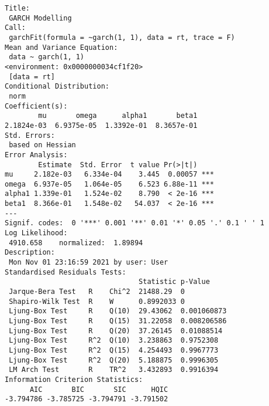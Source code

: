 \documentclass[
  ignorenonframetext,
]{beamer}
\begin{document}
\begin{frame}[fragile]
\begin{verbatim}
Title:
 GARCH Modelling 
Call:
 garchFit(formula = ~garch(1, 1), data = rt, trace = F) 
Mean and Variance Equation:
 data ~ garch(1, 1)
<environment: 0x0000000034cf1f20>
 [data = rt]
Conditional Distribution:
 norm 
Coefficient(s):
        mu       omega      alpha1       beta1  
2.1824e-03  6.9375e-05  1.3392e-01  8.3657e-01  
Std. Errors:
 based on Hessian 
Error Analysis:
        Estimate  Std. Error  t value Pr(>|t|)    
mu     2.182e-03   6.334e-04    3.445  0.00057 ***
omega  6.937e-05   1.064e-05    6.523 6.88e-11 ***
alpha1 1.339e-01   1.524e-02    8.790  < 2e-16 ***
beta1  8.366e-01   1.548e-02   54.037  < 2e-16 ***
---
Signif. codes:  0 '***' 0.001 '**' 0.01 '*' 0.05 '.' 0.1 ' ' 1
Log Likelihood:
 4910.658    normalized:  1.89894 
Description:
 Mon Nov 01 23:16:59 2021 by user: User 
Standardised Residuals Tests:
                                Statistic p-Value    
 Jarque-Bera Test   R    Chi^2  21488.29  0          
 Shapiro-Wilk Test  R    W      0.8992033 0          
 Ljung-Box Test     R    Q(10)  29.43062  0.001060873
 Ljung-Box Test     R    Q(15)  31.22058  0.008206586
 Ljung-Box Test     R    Q(20)  37.26145  0.01088514 
 Ljung-Box Test     R^2  Q(10)  3.238863  0.9752308  
 Ljung-Box Test     R^2  Q(15)  4.254493  0.9967773  
 Ljung-Box Test     R^2  Q(20)  5.188875  0.9996305  
 LM Arch Test       R    TR^2   3.432893  0.9916394  
Information Criterion Statistics:
      AIC       BIC       SIC      HQIC 
-3.794786 -3.785725 -3.794791 -3.791502 
\end{verbatim}
\end{frame}
\end{document}
